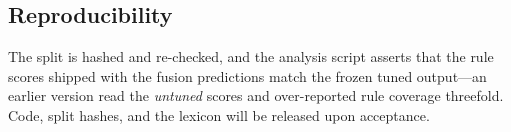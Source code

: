 \subsection{Reproducibility}
\label{sec:repro}

The split is hashed and re-checked, and the analysis script asserts that the rule
scores shipped with the fusion predictions match the frozen tuned output---an earlier
version read the \emph{untuned} scores and over-reported rule coverage threefold.
Code, split hashes, and the lexicon will be released upon acceptance.
